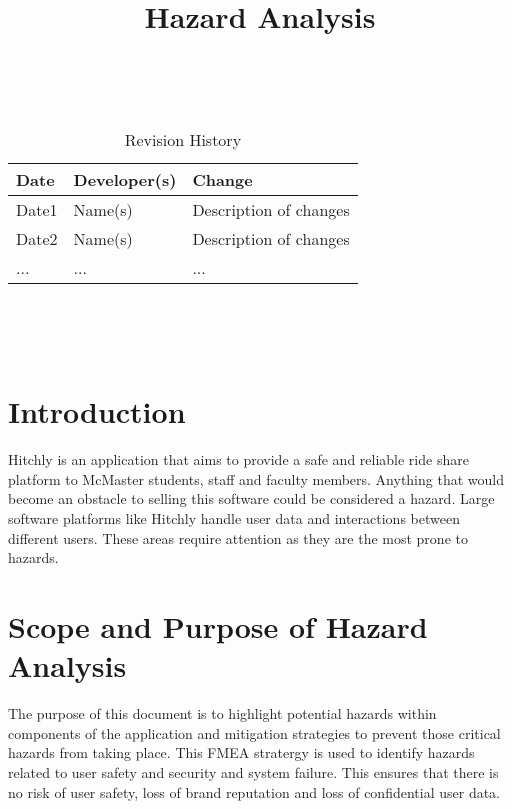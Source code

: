 \documentclass{article}
\title{Hazard Analysis\\\progname}
\author{\authname}
\date{}
\begin{document}
\maketitle
\thispagestyle{empty}

~\newpage


\begin{table}[hp]
\caption{Revision History} \label{TblRevisionHistory}
\begin{tabularx}{\textwidth}{llX}
\toprule
\textbf{Date} & \textbf{Developer(s)} & \textbf{Change}\\
\midrule
Date1 & Name(s) & Description of changes\\
Date2 & Name(s) & Description of changes\\
... & ... & ...\\
\bottomrule
\end{tabularx}
\end{table}

~\newpage

\tableofcontents

~\newpage



\section{Introduction}
Hitchly is an application that aims to provide a safe and reliable ride share platform to McMaster students, staff and faculty members. Anything that would become an obstacle to selling this software could be considered a hazard. Large software platforms like Hitchly handle user data and interactions between different users. These areas require attention as they are the most prone to hazards.  

\section{Scope and Purpose of Hazard Analysis}
The purpose of this document is to highlight potential hazards within components of the application and mitigation strategies to prevent those critical hazards from taking place. This FMEA stratergy is used to identify hazards related to user safety and security and system failure. This ensures that there is no risk of user safety, loss of brand reputation and loss of confidential user data. 
\end{document}
